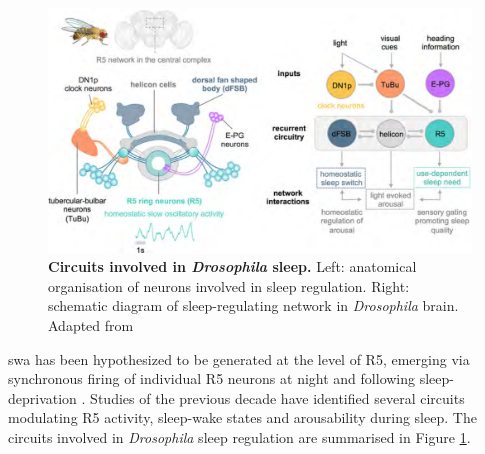 \documentclass[../main.tex]{subfiles}
\begin{document}
\begin{figure}[!b]
    \centering
    \includegraphics[width=\linewidth]{../img/sleep_and_r5_network/sleep_circuit_suarez.png}
    \caption[Circuits involved in \textit{Drosophila} sleep]{
        \textbf{Circuits involved in \textit{Drosophila} sleep.}
        Left: anatomical organisation of neurons involved in sleep regulation. Right: schematic diagram of sleep-regulating network in \textit{Drosophila} brain.
        Adapted from \cite{suarez-grimaltNeuralArchitectureSleep2021}
    }
    \label{fig:droso_sleep_circuit}
\end{figure}

\gls{swa} has been hypothesized to be generated at the level of R5, emerging via synchronous firing of individual R5 neurons at night and following sleep-deprivation \cite{raccugliaNetworkSpecificSynchronizationElectrical2019}.
Studies of the previous decade have identified several circuits modulating R5 activity, sleep-wake states and arousability during sleep. The circuits involved in \textit{Drosophila} sleep regulation are summarised in Figure \ref{fig:droso_sleep_circuit}.
\end{document}
